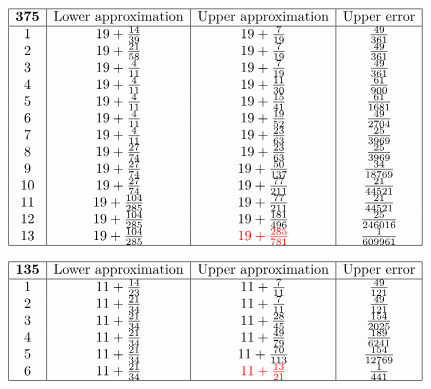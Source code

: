 \documentclass{amsart}
\begin{document}
$$\begin{array}{|c|c|c|c|}
 \hline
 {\bf 375}&\text{Lower approximation}&\text{Upper approximation}&\text{Upper error}\\
 \hline
1&19+\frac{14}{39}&19+\frac{7}{19}&\frac{49}{361}\\
2&19+\frac{21}{58}&19+\frac{7}{19}&\frac{49}{361}\\
3&19+\frac{4}{11}&19+\frac{7}{19}&\frac{49}{361}\\
4&19+\frac{4}{11}&19+\frac{11}{30}&\frac{61}{900}\\
5&19+\frac{4}{11}&19+\frac{15}{41}&\frac{61}{1681}\\
6&19+\frac{4}{11}&19+\frac{19}{52}&\frac{49}{2704}\\
7&19+\frac{4}{11}&19+\frac{23}{63}&\frac{25}{3969}\\
8&19+\frac{27}{74}&19+\frac{23}{63}&\frac{25}{3969}\\
9&19+\frac{27}{74}&19+\frac{50}{137}&\frac{34}{18769}\\
10&19+\frac{27}{74}&19+\frac{77}{211}&\frac{21}{44521}\\
11&19+\frac{104}{285}&19+\frac{77}{211}&\frac{21}{44521}\\
12&19+\frac{104}{285}&19+\frac{181}{496}&\frac{25}{246016}\\
13&19+\frac{104}{285}&{\color{red}19+\frac{285}{781}}&\frac{1}{609961}\\
 \hline
\end{array}$$

$$\begin{array}{|c|c|c|c|}
 \hline
 {\bf 135}&\text{Lower approximation}&\text{Upper approximation}&\text{Upper error}\\
 \hline
 1&11+\frac{14}{23}&11+\frac{7}{11}&\frac{49}{121}\\
2&11+\frac{21}{34}&11+\frac{7}{11}&\frac{49}{121}\\
3&11+\frac{21}{34}&11+\frac{28}{45}&\frac{154}{2025}\\
4&11+\frac{21}{34}&11+\frac{49}{79}&\frac{189}{6241}\\
5&11+\frac{21}{34}&11+\frac{70}{113}&\frac{154}{12769}\\
6&11+\frac{21}{34}&{\color{red}11+\frac{13}{21}}&\frac{1}{441}\\
 \hline
\end{array}$$
\end{document}
